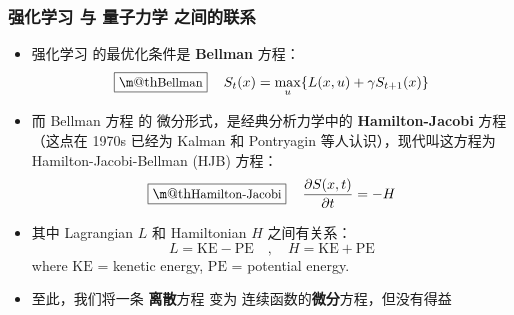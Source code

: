 \documentclass[15pt]{beamer}
\makeatletter
\newcommand{\cc}[2]{#1}
\newcommand{\cc}[2]{#2}
\newcommand{\emp}[1]{{\color{violet}#1}}
\newcommand{\red}[1]{{\color{red}#1}}
\renewcommand{\boxed}[1]{\fbox{\m@th$\displaystyle\scalebox{0.9}{#1}$} \,}
\makeatother
\begin{document}
\begin{frame}
\frametitle{\cc{强化学习 与 量子力学 之间的联系}{Connection between reinforcement learning \& quantum mechanics}}

\begin{itemize}
	\item \cc{
	强化学习 的最优化条件是 \textbf{Bellman} 方程：}{
	The optimal condition for reinforcement learning is the \emp{Bellman} equation:
	}
		\begin{equation}
			\boxed{\mbox{Bellman}} \quad S_t(x) = \max_u \{ L(x,u) + \gamma S_{t+1}(x) \}
		\end{equation}
		
	\item \cc{
	而 Bellman 方程 的 微分形式，是经典分析力学中的 \textbf{Hamilton-Jacobi} 方程 （这点在 1970s 已经为 Kalman 和 Pontryagin 等人认识），现代叫这方程为 Hamilton-Jacobi-Bellman (HJB) 方程：}{
	The differential version of Bellman equation is the \emp{Hamilton-Jacobi} equation in classical analytic mechanics (This has been recognized in 1970's by Kalman, Pontryagin and others):
	}
		\begin{equation}
			\boxed{\mbox{Hamilton-Jacobi}} \quad \frac{\partial S(x, t)}{\partial t} = -H
		\end{equation}
		
	\item \cc{
	其中 Lagrangian $L$ 和 Hamiltonian $H$ 之间有关系：}{
	The Hamiltionian $H$ arises when trying to maximize the Lagrangian $L$ using Lagrangian multipliers.  Such multipliers have the interpretation of \emp{momentum}.
	}
	\begin{equation}
		L = \text{KE} - \text{PE} \quad , \quad H = \text{KE} + \text{PE}
	\end{equation}
	where $\text{KE}$ = kenetic energy, $\text{PE}$ = potential energy.

	\item \cc{
	至此，我们将一条 \textbf{离散}方程 变为 连续函数的\textbf{微分}方程，但\red{没有得益}}{
	Up to now, we changed a \emp{discrete} equation to a continuos \emp{differential} equation, but that has not yielded any advantage
	}
	
\end{itemize}
\end{frame}
\end{document}
